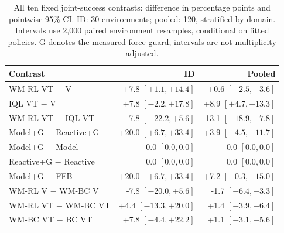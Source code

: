 \begin{table}[t]
\vspace*{5pt}
\centering
\caption{All ten fixed joint-success contrasts: difference in percentage points and pointwise 95\% CI. ID: 30 environments; pooled: 120, stratified by domain. Intervals use 2,000 paired environment resamples, conditional on fitted policies. G denotes the measured-force guard; intervals are not multiplicity adjusted.}
\label{tab:contrasts}
\begingroup
\fontsize{8}{9.2}\selectfont
\setlength{\tabcolsep}{2pt}
\renewcommand{\arraystretch}{1.10}
\begin{tabular*}{\columnwidth}{@{\extracolsep{\fill}}lrr@{}}
\toprule
Contrast & ID & Pooled \\
\midrule
WM-RL VT $-$ V & \shortstack[r]{+7.8\\$[+1.1,+14.4]$} & \shortstack[r]{+0.6\\$[-2.5,+3.6]$} \\
IQL VT $-$ V & \shortstack[r]{+7.8\\$[-2.2,+17.8]$} & \shortstack[r]{+8.9\\$[+4.7,+13.3]$} \\
WM-RL VT $-$ IQL VT & \shortstack[r]{-7.8\\$[-22.2,+5.6]$} & \shortstack[r]{-13.1\\$[-18.9,-7.8]$} \\
Model+G $-$ Reactive+G & \shortstack[r]{+20.0\\$[+6.7,+33.4]$} & \shortstack[r]{+3.9\\$[-4.5,+11.7]$} \\
Model+G $-$ Model & \shortstack[r]{0.0\\$[0.0,0.0]$} & \shortstack[r]{0.0\\$[0.0,0.0]$} \\
Reactive+G $-$ Reactive & \shortstack[r]{0.0\\$[0.0,0.0]$} & \shortstack[r]{0.0\\$[0.0,0.0]$} \\
Model+G $-$ FFB & \shortstack[r]{+20.0\\$[+6.7,+33.4]$} & \shortstack[r]{+7.2\\$[-0.3,+15.0]$} \\
\addlinespace[2pt]
WM-RL V $-$ WM-BC V & \shortstack[r]{-7.8\\$[-20.0,+5.6]$} & \shortstack[r]{-1.7\\$[-6.4,+3.3]$} \\
WM-RL VT $-$ WM-BC VT & \shortstack[r]{+4.4\\$[-13.3,+20.0]$} & \shortstack[r]{+1.4\\$[-3.9,+6.4]$} \\
WM-BC VT $-$ BC VT & \shortstack[r]{+7.8\\$[-4.4,+22.2]$} & \shortstack[r]{+1.1\\$[-3.1,+5.6]$} \\
\bottomrule
\end{tabular*}
\endgroup
\end{table}
